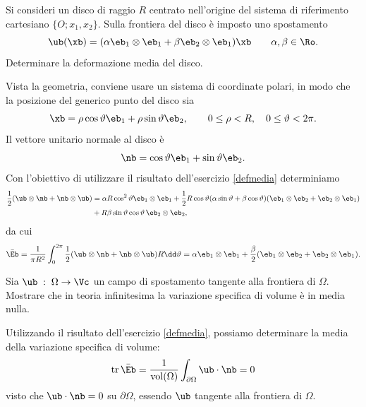 \begin{exercise}
	\item Si consideri un disco di raggio $R$ centrato nell'origine del sistema di riferimento cartesiano $\{O; x_1, x_2\}$. Sulla frontiera del disco è imposto uno spostamento
	\begin{equation}
		\ub(\xb)=(\alpha\eb_1\otimes\eb_1+\beta\eb_2\otimes\eb_1)\xb \qquad \alpha,\beta\in\Ro.
	\end{equation}
	Determinare la deformazione media del disco.
\begin{svolgimento}
Vista la geometria, conviene usare un sistema di coordinate polari, in modo che la posizione del generico punto del disco sia
\begin{equation}
\xb=\rho \cos\vartheta \eb_1+ \rho \sin \vartheta\eb_2, \qquad 0\leq\rho<R, \quad 0\leq \vartheta<2\pi.
\end{equation}
Il vettore unitario normale al disco è 
\begin{equation}
	\nb= \cos\vartheta \eb_1+  \sin \vartheta\eb_2.
\end{equation}
Con l'obiettivo di utilizzare il risultato dell'esercizio \ref{defmedia}
determiniamo
\begin{equation}
\begin{aligned}
	\frac12	(\ub\otimes\nb+\nb\otimes\ub)&=\alpha R \cos^2 \vartheta \eb_1\otimes \eb_1+\frac{1}{2} R \cos\vartheta(\alpha\sin\vartheta+\beta\cos\vartheta)(\eb_1\otimes\eb_2+\eb_2\otimes \eb_1)\\
	&+R \beta \sin\vartheta\cos\vartheta\,\eb_2\otimes\eb_2,
\end{aligned}
\end{equation}
 da cui
 \begin{equation}
 	\bar{\Eb}=\frac{1}{\pi R^2}\int_0^{2\pi}\frac12	(\ub\otimes\nb+\nb\otimes\ub)R \dd \vartheta=\alpha \eb_1\otimes\eb_1+\frac \beta2(\eb_1\otimes\eb_2+\eb_2\otimes \eb_1).
 \end{equation}
\end{svolgimento}
\end{exercise}

\begin{exercise}
	Sia  $\ub\;:\;\Omega\to\Vc$  un campo di spostamento tangente alla frontiera di $\Omega$. Mostrare che in teoria infinitesima la variazione specifica di volume è in media nulla.
	\begin{svolgimento}
Utilizzando il risultato dell'esercizio \ref{defmedia}, possiamo determinare la media della  variazione specifica di volume:
\begin{equation}
\operatorname{tr}\bar{\Eb}=\frac{1}{\operatorname{vol}(\Omega)}\int_{\partial{\Omega}}\ub \cdot \nb=0
\end{equation}
visto che $\ub \cdot \nb=0$ su $\partial{\Omega}$, essendo $\ub$ tangente alla frontiera di $\Omega$.
	\end{svolgimento}
\end{exercise}

